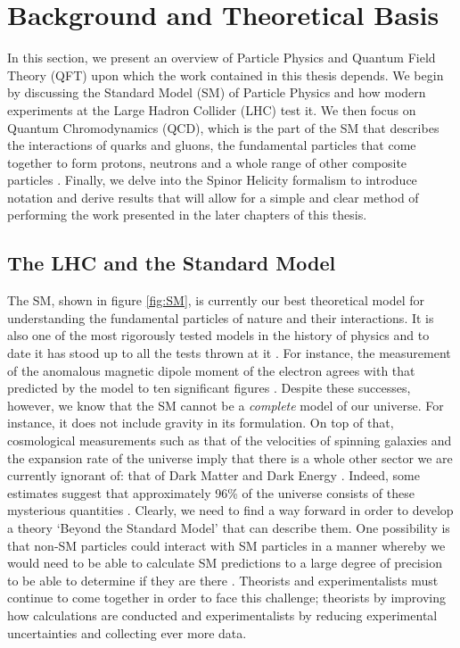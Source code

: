 \chapter{Background and Theoretical Basis}

In this section, we present an overview of Particle Physics and Quantum Field Theory (QFT) upon which the work contained in this thesis depends. We begin by discussing the Standard Model (SM) of Particle Physics and how modern experiments at the Large Hadron Collider (LHC) test it. We then focus on Quantum Chromodynamics (QCD), which is the part of the SM that describes the interactions of quarks and gluons, the fundamental particles that come together to form protons, neutrons and a whole range of other composite particles \cite{PDG}. Finally, we delve into the Spinor Helicity formalism \cite{Elvang2013} to introduce notation and derive results that will allow for a simple and clear method of performing the work presented in the later chapters of this thesis. 

\section{The LHC and the Standard Model}

The SM, shown in figure \ref{fig:SM}, is currently our best theoretical model for understanding the fundamental particles of nature and their interactions. It is also one of the most rigorously tested models in the history of physics and to date it has stood up to all the tests thrown at it \cite{Ellis1995}. For instance, the measurement of the anomalous magnetic dipole moment of the electron agrees with that predicted by the model to ten significant figures \cite{Aoyama2012}. Despite these successes, however, we know that the SM cannot be a \emph{complete} model of our universe. For instance, it does not include gravity in its formulation. On top of that, cosmological measurements such as that of the velocities of spinning galaxies and the expansion rate of the universe imply that there is a whole other sector we are currently ignorant of: that of Dark Matter and Dark Energy \cite{Bertone2005}. Indeed, some estimates suggest that approximately 96\% of the universe consists of these mysterious quantities \cite{Jarosik2011}. Clearly, we need to find a way forward in order to develop a theory `Beyond the Standard Model' that can describe them. One possibility is that non-SM particles could interact with SM particles in a manner whereby we would need to be able to calculate SM predictions to a large degree of precision to be able to determine if they are there . Theorists and experimentalists must continue to come together in order to face this challenge; theorists by improving how calculations are conducted and experimentalists by reducing experimental uncertainties and collecting ever more data. \\

